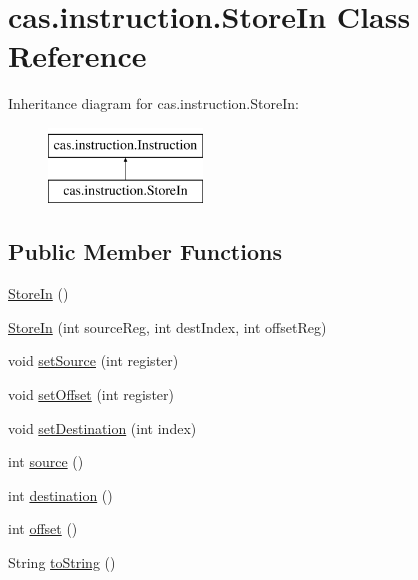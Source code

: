 \hypertarget{classcas_1_1instruction_1_1_store_in}{\section{cas.\-instruction.\-Store\-In Class Reference}
\label{classcas_1_1instruction_1_1_store_in}
}
Inheritance diagram for cas.\-instruction.\-Store\-In\-:\begin{figure}[H]
\begin{center}
\leavevmode
\includegraphics[height=2.000000cm]{classcas_1_1instruction_1_1_store_in}
\end{center}
\end{figure}
\subsection*{Public Member Functions}
\begin{DoxyCompactItemize}
\item 
\hyperlink{classcas_1_1instruction_1_1_store_in_a33150b212240aeadadb2cefec48e9aa3}{Store\-In} ()
\item 
\hyperlink{classcas_1_1instruction_1_1_store_in_aacb521308d8c5c6f54f5701910a7f20a}{Store\-In} (int source\-Reg, int dest\-Index, int offset\-Reg)
\item 
void \hyperlink{classcas_1_1instruction_1_1_store_in_a039f76bbf32ddba31b728c0cd2368b03}{set\-Source} (int register)
\item 
void \hyperlink{classcas_1_1instruction_1_1_store_in_ae8df4279ebed52721b5889dc3c3d9791}{set\-Offset} (int register)
\item 
void \hyperlink{classcas_1_1instruction_1_1_store_in_ae10bf3c8afc70513590d8ec97b2637bf}{set\-Destination} (int index)
\item 
int \hyperlink{classcas_1_1instruction_1_1_store_in_a052ff4369733454bd958c21baa120557}{source} ()
\item 
int \hyperlink{classcas_1_1instruction_1_1_store_in_a49f95a6de0300a080396e14561eb1b21}{destination} ()
\item 
int \hyperlink{classcas_1_1instruction_1_1_store_in_a95c4870dec04b14217758086eb7e836a}{offset} ()
\item 
String \hyperlink{classcas_1_1instruction_1_1_store_in_aed1e070aa72b5f7ec9a11a07e4488d74}{to\-String} ()
\end{DoxyCompactItemize}


